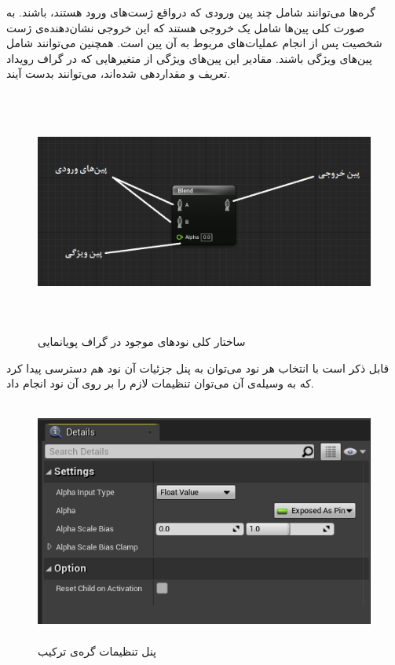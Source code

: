 گره‌‌ها می‌توانند شامل چند پین ورودی که درواقع ژست‌های ورود هستند، باشند.
به صورت کلی پین‌ها شامل یک خروجی هستند که این خروجی نشان‌دهنده‌ی 
ژست شخصیت پس از انجام عملیات‌های مربوط به آن پین است.
همچنین می‌توانند شامل پین‌های ویژگی باشند. مقادیر این پین‌های ویژگی از 
متغیر‌هایی که در گراف رویداد تعریف و مقداردهی شده‌اند، می‌توانند بدست آیند.

\begin{figure}[ht]
	\centerline{\includegraphics[width=\textwidth,height=8cm,keepaspectratio]{Figures/Ch3/AnimNodeStructure.png}}

	\caption{ساختار کلی نود‌های موجود در گراف پویانمایی}
	\label{fig:AnimNodeStructure}
\end{figure}

قابل ذکر است با انتخاب هر نود می‌توان به پنل جزئیات آن نود هم دسترسی پیدا کرد 
که به وسیله‌ی آن می‌توان تنظیمات لازم را بر روی آن نود انجام داد.

\begin{figure}[ht]
	\centerline{\includegraphics[width=\textwidth,height=8cm,keepaspectratio]{Figures/Ch3/DetailsPanel.png}}

	\caption{پنل تنظیمات گره‌ی ترکیب}
	\label{fig:AnimNodeDetailPanel}
\end{figure}

